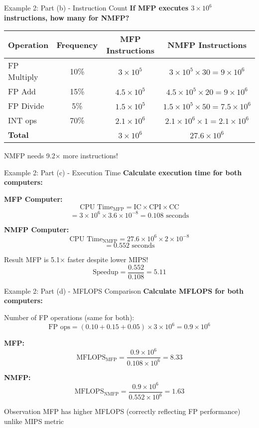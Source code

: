 \documentclass[aspectratio=169,12pt]{beamer}
\begin{document}
\begin{frame}{Example 2: Part (b) - Instruction Count}
\textbf{If MFP executes $3 \times 10^6$ instructions, how many for NMFP?}

\begin{table}[h]
\centering
\small
\begin{tabular}{lccc}
\toprule
Operation & Frequency & MFP Instructions & NMFP Instructions \\
\midrule
FP Multiply & 10\% & $3 \times 10^5$ & $3 \times 10^5 \times 30 = 9 \times 10^6$ \\
FP Add & 15\% & $4.5 \times 10^5$ & $4.5 \times 10^5 \times 20 = 9 \times 10^6$ \\
FP Divide & 5\% & $1.5 \times 10^5$ & $1.5 \times 10^5 \times 50 = 7.5 \times 10^6$ \\
INT ops & 70\% & $2.1 \times 10^6$ & $2.1 \times 10^6 \times 1 = 2.1 \times 10^6$ \\
\midrule
\textbf{Total} & & $3 \times 10^6$ & $27.6 \times 10^6$ \\
\bottomrule
\end{tabular}
\end{table}

NMFP needs 9.2× more instructions!
\end{frame}

\begin{frame}{Example 2: Part (c) - Execution Time}
\textbf{Calculate execution time for both computers:}

\textbf{MFP Computer:}
$$\text{CPU Time}_{\text{MFP}} = \text{IC} \times \text{CPI} \times \text{CC}$$
$$= 3 \times 10^6 \times 3.6 \times 10^{-8} = 0.108 \text{ seconds}$$

\textbf{NMFP Computer:}
$$\text{CPU Time}_{\text{NMFP}} = 27.6 \times 10^6 \times 2 \times 10^{-8}$$
$$= 0.552 \text{ seconds}$$

\begin{block}{Result}
MFP is 5.1× faster despite lower MIPS!
$$\text{Speedup} = \frac{0.552}{0.108} = 5.11$$
\end{block}
\end{frame}

\begin{frame}{Example 2: Part (d) - MFLOPS Comparison}
\textbf{Calculate MFLOPS for both computers:}

Number of FP operations (same for both):
$$\text{FP ops} = (0.10 + 0.15 + 0.05) \times 3 \times 10^6 = 0.9 \times 10^6$$

\textbf{MFP:}
$$\text{MFLOPS}_{\text{MFP}} = \frac{0.9 \times 10^6}{0.108 \times 10^6} = 8.33$$

\textbf{NMFP:}
$$\text{MFLOPS}_{\text{NMFP}} = \frac{0.9 \times 10^6}{0.552 \times 10^6} = 1.63$$

\begin{alertblock}{Observation}
MFP has higher MFLOPS (correctly reflecting FP performance) unlike MIPS metric
\end{alertblock}
\end{frame}
\end{document}
